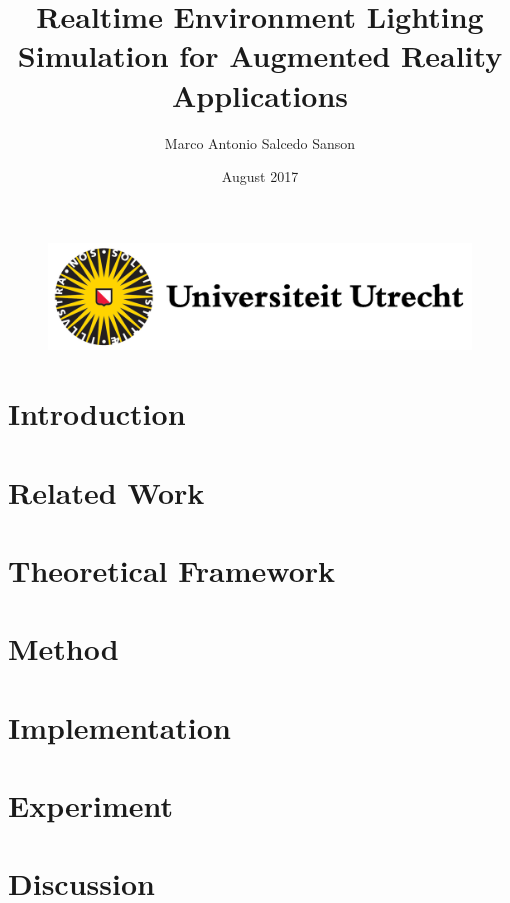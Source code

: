\documentclass{report}
\title{Realtime Environment Lighting Simulation for Augmented Reality Applications}
\author{Marco Antonio Salcedo Sanson }
\date{August 2017}
\begin{document}
\begin{figure}[t]
\includegraphics[scale = 0.5]{Figures/uu-logo.png}
\end{figure}

\maketitle
\clearpage

\tableofcontents{}
\clearpage

\chapter{Introduction}



\chapter{Related Work}


\chapter{Theoretical Framework}


\chapter{Method}


\chapter{Implementation}


\chapter{Experiment}


\chapter{Discussion}


\clearpage


\nocite{*}

\end{document}
